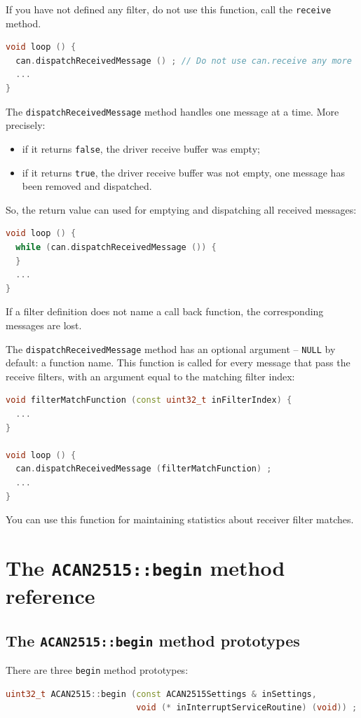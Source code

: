 \documentclass[10pt, a4paper, obeyspaces, openany]{extarticle}
\newcommand \sectionLabel[2]{\section{#1}\label{sec:#2}}
\begin{document}
If you have not defined any filter, do not use this function, call the \texttt{receive} method.


{ \small\begin{lstlisting}[language=c++]
void loop () {
  can.dispatchReceivedMessage () ; // Do not use can.receive any more
  ...
}
\end{lstlisting}}

The \texttt{dispatchReceivedMessage} method handles one message at a time. More precisely:
\begin{itemize}
  \item if it returns \texttt{false}, the driver receive buffer was empty;
  \item if it returns \texttt{true}, the driver receive buffer was not empty, one message has been removed and dispatched.
\end{itemize}

So, the return value can used for emptying and dispatching all received messages:
{ \small\begin{lstlisting}[language=c++]
void loop () {
  while (can.dispatchReceivedMessage ()) {
  }
  ...
}
\end{lstlisting}}

If a filter definition does not name a call back function, the corresponding messages are lost.

The \texttt{dispatchReceivedMessage} method has an optional argument -- \texttt{NULL} by default: a function name. This function is called for every message that pass the receive filters, with an argument equal to the matching filter index:

{ \small\begin{lstlisting}[language=c++]
void filterMatchFunction (const uint32_t inFilterIndex) {
  ...
}

void loop () {
  can.dispatchReceivedMessage (filterMatchFunction) ;
  ...
}
\end{lstlisting}}

You can use this function for maintaining statistics about receiver filter matches.


\sectionLabel{The \texttt{ACAN2515::begin} method reference}{beginMethodReference}

\subsection{The \texttt{ACAN2515::begin} method prototypes}

There are three \texttt{begin} method prototypes:
{ \small\begin{lstlisting}[language=c++]
uint32_t ACAN2515::begin (const ACAN2515Settings & inSettings,
                          void (* inInterruptServiceRoutine) (void)) ;
\end{lstlisting}}
\end{document}

